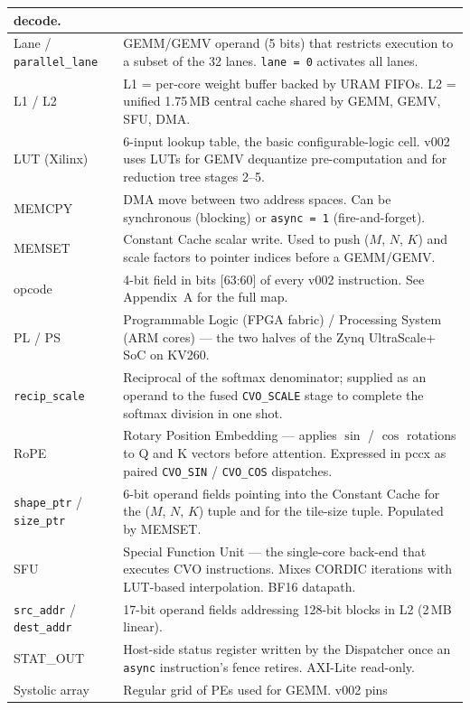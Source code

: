\documentclass[11pt,a4paper,twoside,openany]{report}
\begin{document}
\begin{longtable}{|>{\raggedright\arraybackslash}p{3.8cm}|p{11.8cm}|}
decode. \\
\hline
Lane / \texttt{parallel\_lane} & GEMM/GEMV operand (5 bits) that
restricts execution to a subset of the 32 lanes.  \texttt{lane = 0}
activates all lanes. \\
\hline
L1 / L2 & L1 = per-core weight buffer backed by URAM FIFOs.  L2 =
unified 1.75\,MB central cache shared by GEMM, GEMV, SFU, DMA. \\
\hline
LUT (Xilinx) & 6-input lookup table, the basic configurable-logic
cell.  v002 uses LUTs for GEMV dequantize pre-computation and for
reduction tree stages 2--5. \\
\hline
MEMCPY & DMA move between two address spaces.  Can be synchronous
(blocking) or \texttt{async = 1} (fire-and-forget). \\
\hline
MEMSET & Constant Cache scalar write.  Used to push
($M$, $N$, $K$) and scale factors to pointer indices before a
GEMM/GEMV. \\
\hline
opcode & 4-bit field in bits [63:60] of every v002 instruction.  See
Appendix~A for the full map. \\
\hline
PL / PS & Programmable Logic (FPGA fabric) / Processing System (ARM
cores) --- the two halves of the Zynq UltraScale+ SoC on KV260. \\
\hline
\texttt{recip\_scale} & Reciprocal of the softmax denominator;
supplied as an operand to the fused \texttt{CVO\_SCALE} stage to
complete the softmax division in one shot. \\
\hline
RoPE & Rotary Position Embedding --- applies $\sin$ / $\cos$
rotations to Q and K vectors before attention.  Expressed in pccx as
paired \texttt{CVO\_SIN} / \texttt{CVO\_COS} dispatches. \\
\hline
\texttt{shape\_ptr} / \texttt{size\_ptr} & 6-bit operand fields
pointing into the Constant Cache for the ($M$, $N$, $K$) tuple and
for the tile-size tuple.  Populated by MEMSET. \\
\hline
SFU & Special Function Unit --- the single-core back-end that
executes CVO instructions.  Mixes CORDIC iterations with LUT-based
interpolation.  BF16 datapath. \\
\hline
\texttt{src\_addr} / \texttt{dest\_addr} & 17-bit operand fields
addressing 128-bit blocks in L2 (2\,MB linear). \\
\hline
STAT\_OUT & Host-side status register written by the Dispatcher once
an \texttt{async} instruction's fence retires.  AXI-Lite read-only. \\
\hline
Systolic array & Regular grid of PEs used for GEMM.  v002 pins

\end{longtable}
\end{document}
